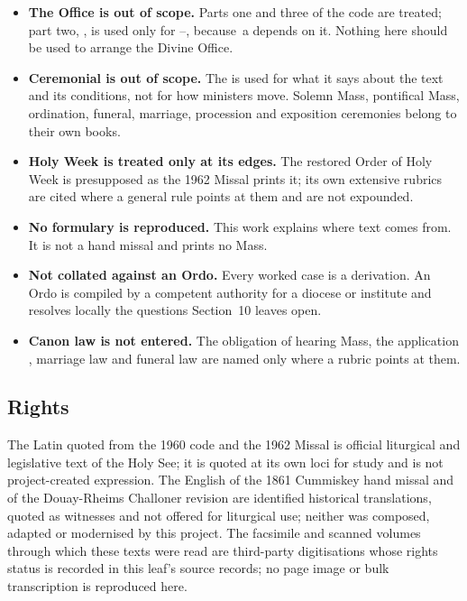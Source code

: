 \begin{itemize}
\item \textbf{The Office is out of scope.} Parts one and three of the code are
treated; part two, , is used only for
--, because \,a depends on it. Nothing here should be
used to arrange the Divine Office.

\item \textbf{Ceremonial is out of scope.} The  is used
for what it says about the text and its conditions, not for how ministers
move. Solemn Mass, pontifical Mass, ordination, funeral, marriage, procession
and exposition ceremonies belong to their own books.

\item \textbf{Holy Week is treated only at its edges.} The restored Order of
Holy Week is presupposed as the 1962 Missal prints it; its own extensive
rubrics are cited where a general rule points at them and are not expounded.

\item \textbf{No formulary is reproduced.} This work explains where text comes
from. It is not a hand missal and prints no Mass.

\item \textbf{Not collated against an Ordo.} Every worked case is a derivation.
An Ordo is compiled by a competent authority for a diocese or institute and
resolves locally the questions Section~10 leaves open.

\item \textbf{Canon law is not entered.} The obligation of hearing Mass, the
application , marriage law and funeral law are named only
where a rubric points at them.
\end{itemize}

\subsection{Rights}

The Latin quoted from the 1960 code and the 1962 Missal is official liturgical
and legislative text of the Holy See; it is quoted at its own loci for study
and is not project-created expression. The English of the 1861 Cummiskey hand
missal and of the Douay-Rheims Challoner revision are identified historical
translations, quoted as witnesses and not offered for liturgical use; neither
was composed, adapted or modernised by this project. The facsimile and scanned
volumes through which these texts were read are third-party digitisations whose
rights status is recorded in this leaf's source records; no page image or bulk
transcription is reproduced here.

